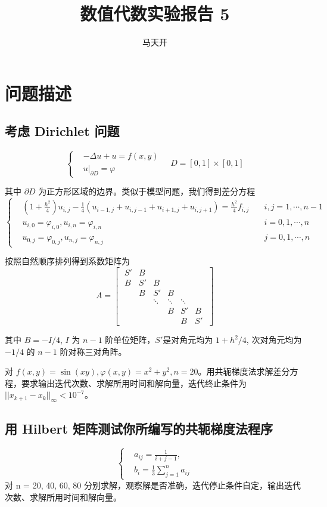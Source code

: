 \documentclass{article}
\title{数值代数实验报告 5}
\author{马天开}
\begin{document}
\maketitle

\section{问题描述}

\subsection{考虑 Dirichlet 问题}
\[
\left\{
\begin{aligned}
& -\Delta u+u=f(x,y)\\
& u|_{\partial D}=\varphi
\end{aligned}
\right.\quad D=[0,1]×[0,1]
\]

其中 $\partial D$ 为正方形区域的边界。类似于模型问题，我们得到差分方程
\[
\left\{
\begin{aligned}
& (1 + \frac{h^2}{4})u_{i,j}-\frac{1}{4}(u_{i-1,j}+u_{i,j-1}+u_{i+1,j}+u_{i,j+1}) = \frac{h^2}{4}f_{i,j}\quad & i,j=1,\cdots ,n-1\\
& u_{i,0}=\varphi_{i,0},u_{i,n}=\varphi_{i,n}& i=0,1,\cdots ,n \\
& u_{0,j}=\varphi_{0,j},u_{n,j}=\varphi_{n,j}& j=0,1,\cdots ,n
\end{aligned}
\right.
\]

按照自然顺序排列得到系数矩阵为
\[
A=\begin{bmatrix}
\;S' & B &  &  &  &  \;\\
\;B & S' & B &  &  &  \;\\
\; & B & S' & B &  &  \;\\
\;  & & \ddots & \ddots & \ddots \;\\
\; &  &  & B & S' & B\;\\
\; &  &  &  & B & S'\;
\end{bmatrix}
\]



其中 $B = -I/4$, $I$ 为 $n-1$ 阶单位矩阵，$S'$是对角元均为 $1+h^2/4$,
次对角元均为 $-1/4$ 的 $n-1$ 阶对称三对角阵。

对 $f(x, y) = \sin(xy), \varphi(x, y) = x^2 + y^2, n = 20$。用共轭梯度法求解差分方程，要求输出迭代次数、求解所用时间和解向量，迭代终止条件为$||x_{k+1}-x_k||_{\infty} < 10^{-7}$。


\subsection{用 Hilbert 矩阵测试你所编写的共轭梯度法程序}
\[
\left\{
\begin{aligned}
& a_{ij}=\frac{1}{i+j-1},\\
& b_i =\frac{1}{3}\sum_{j=1}^{n}a_{ij}
\end{aligned}
\right.
\]
对 n = 20, 40, 60, 80 分别求解，观察解是否准确，迭代停止条件自定，输出迭代次数、求解所用时间和解向量。
\end{document}
